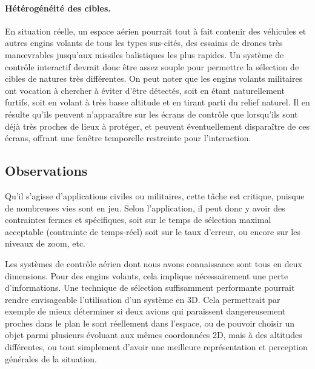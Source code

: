 	\paragraph{Hétérogénéité des cibles.}
	En situation réelle, un espace aérien pourrait tout à fait contenir des véhicules et autres engins volants de tous les types sus-cités, des essaims de drones très manœvrables jusqu'aux missiles balistiques les plus rapides. Un système de contrôle interactif devrait donc être assez souple pour permettre la sélection de cibles de natures très différentes.
	On peut noter que les engins volants militaires ont vocation à chercher à éviter d'être détectés, soit en étant naturellement furtifs, soit en volant à très basse altitude et en tirant parti du relief naturel. Il en résulte qu'ils peuvent n'apparaître sur les écrans de contrôle que lorsqu'ils sont déjà très proches de lieux à protéger, et peuvent éventuellement disparaître de ces écrans, offrant une fenêtre temporelle restreinte pour l'interaction.
	
	\subsection{Observations}
	Qu'il s'agisse d'applications civiles ou militaires, cette tâche est critique, puisque de nombreuses vies sont en jeu. Selon l'application, il peut donc y avoir des contraintes fermes et spécifiques, soit sur le temps de sélection maximal acceptable (contrainte de temps-réel) soit sur le taux d'erreur, ou encore sur les niveaux de zoom, etc.

	Les systèmes de contrôle aérien dont nous avons connaissance sont tous en deux dimensions. Pour des engins volants, cela implique nécessairement une perte d'informations. Une technique de sélection suffisamment performante pourrait rendre envisageable l'utilisation d'un système en 3D. Cela permettrait par exemple de mieux déterminer si deux avions qui paraissent dangereusement proches dans le plan le sont réellement dans l'espace, ou de pouvoir choisir un objet parmi plusieurs évoluant aux mêmes coordonnées 2D, mais à des altitudes différentes, ou tout simplement d'avoir une meilleure représentation et perception générales de la situation.

